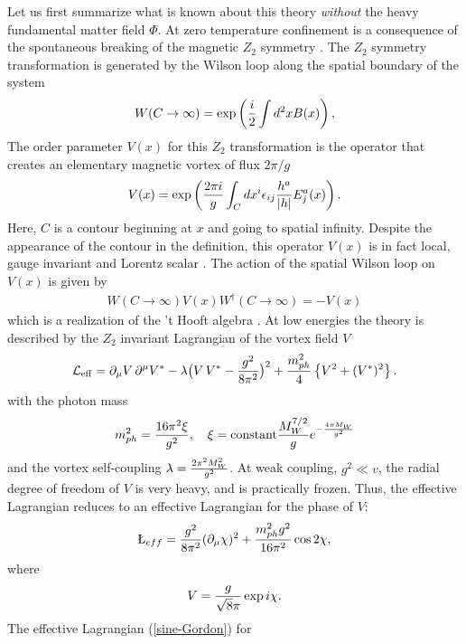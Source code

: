 \documentclass[a4paper,aps,prd,superscriptaddress,showpacs,showkeys]{revtex4}
\begin{document}
Let us first summarize what is known \cite{gg1,kk} about this theory
{\it without} the heavy fundamental matter field $\Phi$.
At zero temperature confinement is a consequence of the spontaneous
breaking of the magnetic $Z_2$ symmetry \cite{thooft,kovner}. The $Z_2$
symmetry transformation is generated by the Wilson loop along the spatial
boundary of the system
\begin{eqnarray}W(C \rightarrow \infty ) = \mbox{exp}\left( {i\over
2}\int d^2 x
B(x)\right),
\end{eqnarray}The order parameter $V(x)$ for this $Z_2$ transformation
is the operator
that creates an elementary magnetic vortex of flux $2\pi/g$
\begin{eqnarray}V(x) = \mbox{exp}\left({{2\pi i\over g}} \int_C
dx^i \epsilon_{ij}{h^a\over
|h|} E^a_j(x)\right).
\label{v}
\end{eqnarray}
Here, $C$ is a contour beginning at $x$ and going to
spatial infinity.
Despite the appearance of the contour in the definition, this operator
$V(x)$ is in fact local, gauge invariant and Lorentz scalar
\cite{kovner}.
The action of the spatial Wilson loop on $V(x)$ is given by
\begin{eqnarray}
W(C \rightarrow \infty )V(x)W^\dagger(C \rightarrow\infty) =- V(x)
\end{eqnarray}
which is a realization of the 't Hooft algebra \cite{thooft,kovner}.
At low energies the theory  is described by the $Z_2$
invariant Lagrangian of the vortex field $V$
\begin{equation}
{\mathcal L}_{\rm eff}= \partial_\mu V\, \partial^\mu V^* -
\lambda \bigl( V\, V^* - {g^2\over 8\pi^2}\bigr)^2 +
{m_{ph}^2\over 4} \left\{ V^2 + (V^*)^2\right\}.
\label{lowlagrangian}
\end{equation}
with the photon mass \cite{Prasad}
\begin{eqnarray}m_{ph}^2= {16 \pi^2 \xi\over{g^2}},
\ \ \
  \xi = \mbox{constant}
{M_W^{7/2}\over g} e^{-{4\pi M_W \over g^2} }
\label{mph}
\end{eqnarray}
and the vortex self-coupling $\lambda={2\pi^2M_W^2\over g^2}$. At weak
coupling, $g^2\ll v$,  the radial degree of freedom of $V$ is very heavy,
and is practically frozen. Thus, the effective Lagrangian reduces to an
effective Lagrangian for the phase of $V$:
\begin{eqnarray}\L_{eff} =
  {g^2\over 8 \pi^2}(\partial_{\mu}\chi)^2 + {m_{ph}^2 g^2\over
16\pi^2}\cos
2\chi,
\label{sine-Gordon}
\end{eqnarray}
where
\begin{eqnarray}V={g\over {\sqrt 8}\pi}\exp{i\chi} .
\end{eqnarray}The effective Lagrangian (\ref{sine-Gordon}) for
\end{document}
